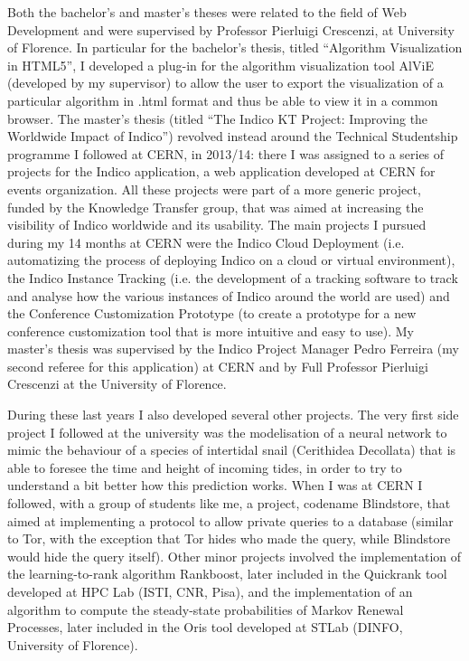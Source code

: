 \documentclass{article}
\begin{document}
    Both the bachelor's and master's theses were related to the field of Web Development and were supervised by Professor Pierluigi Crescenzi, at University of Florence. In particular for the bachelor's thesis, titled ``Algorithm Visualization in HTML5'', I developed a plug-in for the algorithm visualization tool AlViE (developed by my supervisor) to allow the user to export the visualization of a particular algorithm in .html format and thus be able to view it in a common browser. The master's thesis (titled ``The Indico KT Project: Improving the Worldwide Impact of Indico'') revolved instead around the Technical Studentship programme I followed at CERN, in 2013/14: there I was assigned to a series of projects for the Indico application, a web application developed at CERN for events organization. All these projects were part of a more generic project, funded by the Knowledge Transfer group, that was aimed at increasing the visibility of Indico worldwide and its usability. The main projects I pursued during my 14 months at CERN were the Indico Cloud Deployment (i.e. automatizing the process of deploying Indico on a cloud or virtual environment), the Indico Instance Tracking (i.e. the development of a tracking software to track and analyse how the various instances of Indico around the world are used) and the Conference Customization Prototype (to create a prototype for a new conference customization tool that is more intuitive and easy to use). My master's thesis was supervised by the Indico Project Manager Pedro Ferreira (my second referee for this application) at CERN and by Full Professor Pierluigi Crescenzi at the University of Florence. \par \bigskip
    
    During these last years I also developed several other projects. The very first side project I followed at the university was the modelisation of a neural network to mimic the behaviour of a species of intertidal snail (Cerithidea Decollata) that is able to foresee the time and height of incoming tides, in order to try to understand a bit better how this prediction works. When I was at CERN I followed, with a group of students like me, a project, codename Blindstore, that aimed at implementing a protocol to allow private queries to a database (similar to Tor, with the exception that Tor hides who made the query, while Blindstore would hide the query itself). Other minor projects involved the implementation of the learning-to-rank algorithm Rankboost, later included in the Quickrank tool developed at HPC Lab (ISTI, CNR, Pisa), and the implementation of an algorithm to compute the steady-state probabilities of Markov Renewal Processes, later included in the Oris tool developed at STLab (DINFO, University of Florence). \par \bigskip
    
\end{document}
